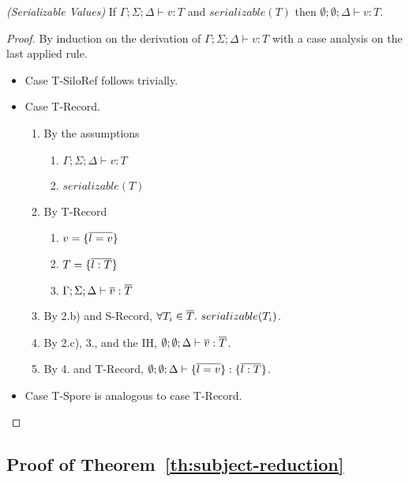 \begin{thm}
\emph{(Serializable Values)}
If $\Gamma ; \Sigma ; \Delta \vdash v : T$ and $serializable(T)$ then $\emptyset ; \emptyset ; \Delta \vdash v : T$.
\end{thm}
\begin{proof}
By induction on the derivation of $\Gamma ; \Sigma ; \Delta \vdash v : T$ with a case analysis on the last applied rule.

\begin{itemize}
\item Case T-SiloRef follows trivially.

\item Case T-Record.
\begin{enumerate}
\item By the assumptions
  \begin{enumerate}[label=(\alph*)]
  \item $\Gamma ; \Sigma ; \Delta \vdash v : T$
  \item $serializable(T)$
  \end{enumerate}
\item By T-Record
  \begin{enumerate}[label=(\alph*)]
  \item $v = \{\overline{l = v}\}$
  \item $T = \{\overline{l : T}\}$
  \item $\Gamma ; \Sigma ; \Delta \vdash \overline{v} : \overline{T}$
  \end{enumerate}
\item By 2.b) and S-Record, $\forall T_i \in \overline{T}.~serializable(T_i)$.
\item By 2.c), 3., and the IH, $\emptyset ; \emptyset ; \Delta \vdash \overline{v} : \overline{T}$.
\item By 4. and T-Record, $\emptyset ; \emptyset ; \Delta \vdash \{\overline{l = v}\} : \{\overline{l : T}\}$.
\end{enumerate}

\item Case T-Spore is analogous to case T-Record.
\end{itemize}
\end{proof}

\subsection{Proof of Theorem~\ref{th:subject-reduction}}\label{app:subject-reduction}

